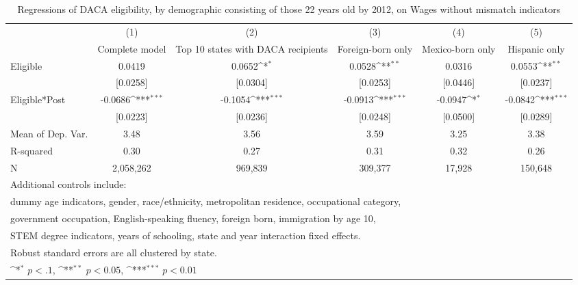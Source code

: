 \begin{table}[htbp]\centering
\def\sym#1{\ifmmode^{#1}\else\(^{#1}\)\fi}
\caption{Regressions of DACA eligibility, by demographic consisting of those 22 years old by 2012, on Wages without mismatch indicators}
\begin{tabular}{l*{5}{c}}
\toprule
                    &\multicolumn{1}{c}{(1)}         &\multicolumn{1}{c}{(2)}         &\multicolumn{1}{c}{(3)}         &\multicolumn{1}{c}{(4)}         &\multicolumn{1}{c}{(5)}         \\
                    &Complete model         &Top 10 states with DACA recipients         &Foreign-born only         &Mexico-born only         &Hispanic only         \\
\midrule
Eligible            &      0.0419         &      0.0652\sym{*}  &      0.0528\sym{**} &      0.0316         &      0.0553\sym{**} \\
                    &    [0.0258]         &    [0.0304]         &    [0.0253]         &    [0.0446]         &    [0.0237]         \\
\addlinespace
Eligible*Post       &     -0.0686\sym{***}&     -0.1054\sym{***}&     -0.0913\sym{***}&     -0.0947\sym{*}  &     -0.0842\sym{***}\\
                    &    [0.0223]         &    [0.0236]         &    [0.0248]         &    [0.0500]         &    [0.0289]         \\
\midrule
Mean of Dep. Var.   &        3.48         &        3.56         &        3.59         &        3.25         &        3.38         \\
R-squared           &        0.30         &        0.27         &        0.31         &        0.32         &        0.26         \\
N                   &   2,058,262         &     969,839         &     309,377         &      17,928         &     150,648         \\
\bottomrule
\multicolumn{6}{l}{\footnotesize Additional controls include:}\\
\multicolumn{6}{l}{\footnotesize dummy age indicators, gender, race/ethnicity, metropolitan residence, occupational category,}\\
\multicolumn{6}{l}{\footnotesize government occupation, English-speaking fluency, foreign born, immigration by age 10,}\\
\multicolumn{6}{l}{\footnotesize STEM degree indicators, years of schooling, state and year interaction fixed effects.}\\
\multicolumn{6}{l}{\footnotesize Robust standard errors are all clustered by state.}\\
\multicolumn{6}{l}{\footnotesize \sym{*} \(p<.1\), \sym{**} \(p<0.05\), \sym{***} \(p<0.01\)}\\
\end{tabular}
\end{table}
